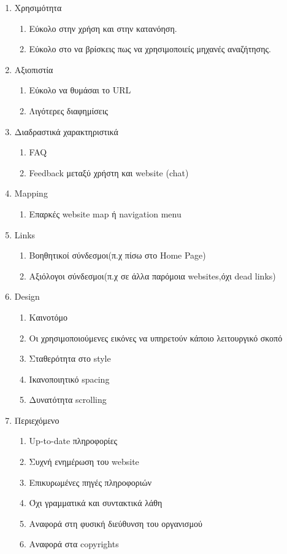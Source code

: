 \begin{enumerate}
	\item Χρησιμότητα
	\begin{enumerate}
		\item Εύκολο στην χρήση και στην κατανόηση.
		\item Εύκολο στο να βρίσκεις πως να χρησιμοποιείς μηχανές αναζήτησης.
	\end{enumerate}
	\item Αξιοπιστία
	\begin{enumerate}
		\item Εύκολο να θυμάσαι το URL
		\item Λιγότερες διαφημίσεις 
	\end{enumerate}
	\item Διαδραστικά χαρακτηριστικά
	\begin{enumerate}
		\item FAQ
		\item Feedback μεταξύ χρήστη και website (chat)
	\end{enumerate}
	\item Mapping
	\begin{enumerate}
		\item Επαρκές website map ή navigation menu
	\end{enumerate}
	\item Links
	\begin{enumerate}
		\item Βοηθητικοί σύνδεσμοι(π.χ πίσω στο Home Page)
		\item Αξιόλογοι σύνδεσμοι(π.χ σε άλλα παρόμοια websites,όχι dead links)
	\end{enumerate}
	\item Design
	\begin{enumerate}
		\item Καινοτόμο 
		\item Οι χρησιμοποιούμενες εικόνες να υπηρετούν κάποιο λειτουργικό σκοπό
		\item Σταθερότητα στο style
		\item Ικανοποιητικό spacing
		\item Δυνατότητα scrolling
	\end{enumerate}
	\item Περιεχόμενο
	\begin{enumerate}
		\item Up-to-date πληροφορίες
		\item Συχνή ενημέρωση του website
		\item Επικυρωμένες πηγές πληροφοριών
		\item Όχι γραμματικά και συντακτικά λάθη
		\item Αναφορά στη φυσική διεύθυνση του οργανισμού
		\item Αναφορά στα copyrights
	\end{enumerate}
\end{enumerate}
